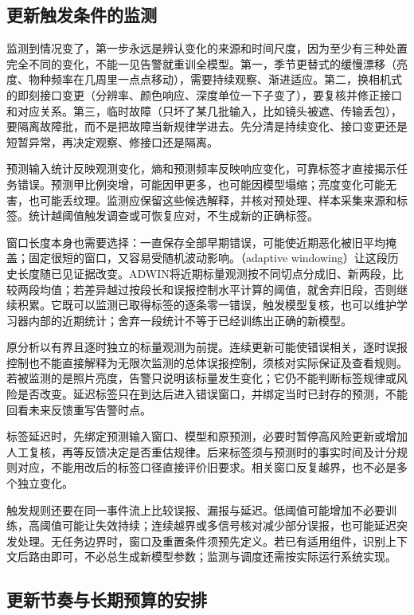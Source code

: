 \subsection{更新触发条件的监测}
\label{sec:ket-update-monitoring}

监测到情况变了，第一步永远是辨认变化的来源和时间尺度，因为至少有三种处置完全不同的变化，不能一见告警就重训全模型。第一，季节更替式的缓慢漂移（亮度、物种频率在几周里一点点移动），需要持续观察、渐进适应。第二，换相机式的即刻接口变更（分辨率、颜色响应、深度单位一下子变了），要复核并修正接口和对应关系。第三，临时故障（只坏了某几批输入，比如镜头被遮、传输丢包），要隔离故障批，而不是把故障当新规律学进去。先分清是持续变化、接口变更还是短暂异常，再决定观察、修接口还是隔离。

预测输入统计反映观测变化，熵和预测频率反映响应变化，可靠标签才直接揭示任务错误。预测甲比例突增，可能因甲更多，也可能因模型塌缩；亮度变化可能无害，也可能丢纹理。监测应保留这些候选解释，并核对预处理、样本采集来源和标签。统计越阈值触发调查或可恢复应对，不生成新的正确标签。

窗口长度本身也需要选择：一直保存全部早期错误，可能使近期恶化被旧平均掩盖；固定很短的窗口，又容易受随机波动影响。（adaptive windowing）让这段历史长度随已见证据改变。ADWIN将近期标量观测按不同切点分成旧、新两段，比较两段均值；若差异越过按段长和误报控制水平计算的阈值，就舍弃旧段，否则继续积累。它既可以监测已取得标签的逐条零一错误，触发模型复核，也可以维护学习器内部的近期统计；舍弃一段统计不等于已经训练出正确的新模型。

原分析以有界且逐时独立的标量观测为前提。连续更新可能使错误相关，逐时误报控制也不能直接解释为无限次监测的总体误报控制，须核对实际保证及查看规则。若被监测的是照片亮度，告警只说明该标量发生变化；它仍不能判断标签规律或风险是否改变。延迟标签只在到达后进入错误窗口，并绑定当时已封存的预测，不能回看未来反馈重写告警时点。

标签延迟时，先绑定预测输入窗口、模型和原预测，必要时暂停高风险更新或增加人工复核，再等反馈决定是否重估规律。后来标签须与预测时的事实时间及计分规则对应，不能用改后的标签口径直接评价旧要求。相关窗口反复越界，也不必是多个独立变化。

触发规则还要在同一事件流上比较误报、漏报与延迟。低阈值可能增加不必要训练，高阈值可能让失效持续；连续越界或多信号核对减少部分误报，也可能延迟突发处理。无任务边界时，窗口及重置条件须预先定义。若已有适用组件，识别上下文后路由即可，不必总生成新模型参数；监测与调度还需按实际运行系统实现。

\subsection{更新节奏与长期预算的安排}
\label{sec:ket-update-budget}

